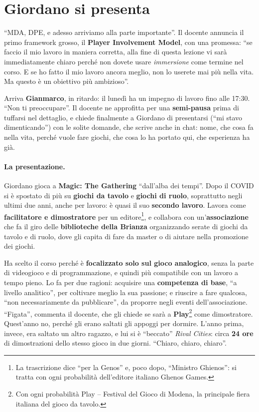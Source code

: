 \section{Giordano si presenta}
\label{a3:sec:giordano}

``MDA, DPE, e adesso arriviamo alla parte importante''. Il docente annuncia il
primo framework grosso, il \textbf{Player Involvement Model}, con una promessa:
``se faccio il mio lavoro in maniera corretta, alla fine di questa lezione vi
sarà immediatamente chiaro perché non dovete usare \emph{immersione} come termine
nel corso. E se ho fatto il mio lavoro ancora meglio, non lo userete mai più
nella vita. Ma questo è un obiettivo più ambizioso''.

Arriva \textbf{Gianmarco}, in ritardo: il lunedì ha un impegno di lavoro fino
alle 17:30. ``Non ti preoccupare''. Il docente ne approfitta per una
\textbf{semi-pausa} prima di tuffarsi nel dettaglio, e chiede finalmente a
Giordano di presentarsi (``mi stavo dimenticando'') con le solite domande, che
scrive anche in chat: nome, che cosa fa nella vita, perché vuole fare giochi,
che cosa lo ha portato qui, che esperienza ha già.

\paragraph{La presentazione.} Giordano gioca a \textbf{Magic: The Gathering}
``dall'alba dei tempi''. Dopo il COVID si è spostato di più su \textbf{giochi da
tavolo} e \textbf{giochi di ruolo}, soprattutto negli ultimi due anni, anche per
lavoro: è quasi il suo \textbf{secondo lavoro}. Lavora come
\textbf{facilitatore e dimostratore} per un editore\footnote{La trascrizione dice
``per la Genos'' e, poco dopo, ``Ministro Ghienos'': si tratta con ogni
probabilità dell'editore italiano Ghenos Games.}, e collabora con
un'\textbf{associazione} che fa il giro delle \textbf{biblioteche della Brianza}
organizzando serate di giochi da tavolo e di ruolo, dove gli capita di fare da
master o di aiutare nella promozione dei giochi.

Ha scelto il corso perché è \textbf{focalizzato solo sul gioco analogico}, senza
la parte di videogioco e di programmazione, e quindi più compatibile con un
lavoro a tempo pieno. Lo fa per due ragioni: acquisire una \textbf{competenza di
base}, ``a livello analitico'', per coltivare meglio la sua passione; e riuscire
a fare qualcosa, ``non necessariamente da pubblicare'', da proporre negli eventi
dell'associazione. ``Figata'', commenta il docente, che gli chiede se sarà a
\textbf{Play}\footnote{Con ogni probabilità Play -- Festival del Gioco di
Modena, la principale fiera italiana del gioco da tavolo.} come dimostratore.
Quest'anno no, perché gli erano saltati gli appoggi per dormire. L'anno prima,
invece, era saltato un altro ragazzo, e lui si è ``beccato'' \emph{Rival
Cities}: circa \textbf{24 ore} di dimostrazioni dello stesso gioco in due
giorni. ``Chiaro, chiaro, chiaro''.

